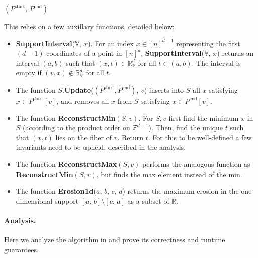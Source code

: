 \documentclass[a4paper,UKenglish,thm-restate]{article}
\theoremstyle{definition}
\def\bbv{\mathbb{V}}
\begin{document}
\begin{algorithmic}
                        \EndFor
                        \State \Return $(P^{\mathrm{start}},\,P^{\mathrm{end}})$
                    \EndFunction
                    
                \end{algorithmic}

        This relies on a few auxillary functions, detailed below:
        \begin{itemize}
            \item \textbf{SupportInterval}($\mathbb{V}$, $x$). For an index $x \in [n]^{d-1}$ representing the first $(d-1)$ coordinates of a point in $[n]^d$, \textbf{SupportInterval}($\mathbb{V}$, $x$) returns an interval $(a, b)$ such that $(x, t) \in \mathbb{R}_\bbv^d$ for all $t \in (a, b)$. The interval is empty if $(v, x) \notin \mathbb{R}_\bbv^d$ for all $t$.
            
            \item The function $S$.\textbf{Update}($(P^{\mathrm{start}}, P^{\mathrm{end}})$, $v$) inserts into $S$ all $x$ satisfying $x \in P^{\mathrm{start}}[v]$, and removes all $x$ from $S$ satisfying $x \in P^{\mathrm{end}}[v]$.

            \item The function \textbf{ReconstructMin}$(S, v)$. For $S, v$ first find the minimum $x$ in $S$ (according to the product order on $\mathbb{Z}^{d-1}$). Then, find the unique $t$ such that $(x, t)$ lies on the fiber of $v$. Return $t$. For this to be well-defined a few invariants need to be upheld, described in the analysis.

            \item The function \textbf{ReconstructMax}$(S, v)$ performs the analogous function as \textbf{ReconstructMin}$(S, v)$, but finds the max element instead of the min.

           \item The function \textbf{Erosion1d}($a,\,b,\,c,\,d$) returns the maximum erosion in the one dimensional support $[a,\,b]\setminus[c,\,d]$ as a subset of $\mathbb{R}$.

        \end{itemize}
            \paragraph*{Analysis.}
            Here we analyze the algorithm in  and prove its correctness and runtime guarantees.
            
\end{document}

